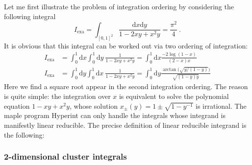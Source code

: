 \documentclass[12pt]{article}
\theoremstyle{definition}
\theoremstyle{plain}
\newcommand{\dif}{\mathrm{d}} %
\begin{document}
Let me first illustrate the problem of integration ordering by considering the following integral
\[
   I_{\text{exa}}= \int_{[0,1]^{2}} \frac{\dif x\dif y}{1-2xy+x^{2}y} = \frac{\pi^{2}}{4}  \:. 
\]
It is obvious that this integral can be worked out via two ordering of integration:
\begin{align*}
        I_{\text{exa}} &=\int_{0}^{1} \dif x \int_{0}^{1}\dif y\: \frac{1}{1-2xy+x^{2}y} =\int_{0}^{1}\dif x \frac{-2\log(1-x)}{(2-x)x}\\
        I_{\text{exa}} &=\int_{0}^{1} \dif y \int_{0}^{1}\dif x\: \frac{1}{1-2xy+x^{2}y} =\int_{0}^{1}\dif y \frac{\arctan\bigl(\sqrt{y/(1-y)}\bigr)}{\sqrt{(1-y)y}}         
\end{align*}
Here we find a square root appear in the second integration ordering. The reason is quite simple: the integration over $x$ is equivalent to solve the polynomial equation $1-xy+x^{2}y$, whose solution $x_{\pm}(y)=1\pm\sqrt{1-y^{-1}}$ is irrational. The maple program Hyperint can only handle the integrals whose integrand is manifestly linear reducible. The precise definition of linear reducible integrand is the following:


\subsubsection{2-dimensional cluster integrals}
\end{document}
